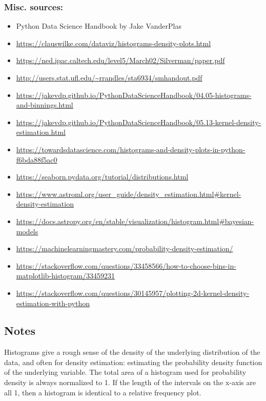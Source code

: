 \subsubsection*{Misc. sources:}

\begin{itemize}
    \item Python Data Science Handbook by Jake VanderPlas
    \item \url{https://clauswilke.com/dataviz/histograms-density-plots.html}
    \item \url{https://ned.ipac.caltech.edu/level5/March02/Silverman/paper.pdf}
    \item \url{http://users.stat.ufl.edu/~rrandles/sta6934/smhandout.pdf}
    \item \url{https://jakevdp.github.io/PythonDataScienceHandbook/04.05-histograms-and-binnings.html}
    \item \url{https://jakevdp.github.io/PythonDataScienceHandbook/05.13-kernel-density-estimation.html}
    \item \url{https://towardsdatascience.com/histograms-and-density-plots-in-python-f6bda88f5ac0}
    \item \url{https://seaborn.pydata.org/tutorial/distributions.html}
    \item \url{https://www.astroml.org/user_guide/density_estimation.html#kernel-density-estimation}
    \item \url{https://docs.astropy.org/en/stable/visualization/histogram.html#bayesian-models}
    \item \url{https://machinelearningmastery.com/probability-density-estimation/}
    \item \url{https://stackoverflow.com/questions/33458566/how-to-choose-bins-in-matplotlib-histogram/33459231}
    \item \url{https://stackoverflow.com/questions/30145957/plotting-2d-kernel-density-estimation-with-python}
\end{itemize}



\subsection*{Notes}

Histograms give a rough sense of the density of the underlying distribution of the data, and often for density estimation: estimating the probability density function of the underlying variable. The total area of a histogram used for probability density is always normalized to 1. If the length of the intervals on the x-axis are all 1, then a histogram is identical to a relative frequency plot.

